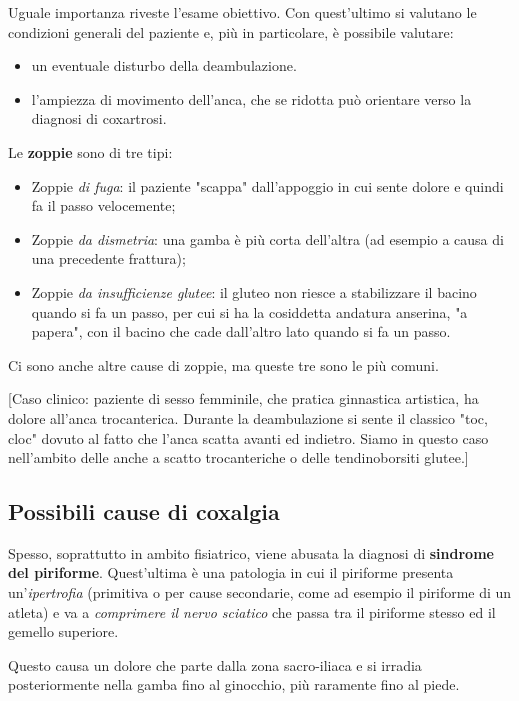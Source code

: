 Uguale importanza riveste l'esame obiettivo. Con quest'ultimo si valutano le condizioni generali del paziente e, più in particolare, è possibile valutare:

\begin{itemize}
\item
  un eventuale disturbo della deambulazione.
\item
  l'ampiezza di movimento dell'anca, che se ridotta può orientare verso la diagnosi di coxartrosi.
\end{itemize}

Le \textbf{zoppie} sono di tre tipi:

\begin{itemize}
\item
  Zoppie \emph{di fuga}: il paziente "scappa" dall'appoggio in cui sente dolore e quindi fa il passo velocemente;
\item
  Zoppie \emph{da dismetria}: una gamba è più corta dell'altra (ad esempio a causa di una precedente frattura);
\item
  Zoppie \emph{da insufficienze glutee}: il gluteo non riesce a stabilizzare il bacino quando si fa un passo, per cui si ha la cosiddetta andatura anserina, "a papera", con il bacino che cade dall'altro lato quando si fa un passo.
\end{itemize}

Ci sono anche altre cause di zoppie, ma queste tre sono le più comuni.

{[}Caso clinico: paziente di sesso femminile, che pratica ginnastica artistica, ha dolore all'anca trocanterica. Durante la deambulazione si sente il classico "toc, cloc" dovuto al fatto che l'anca scatta avanti ed indietro. Siamo in questo caso nell'ambito delle anche a scatto trocanteriche o delle tendinoborsiti glutee.{]}

\subsection{Possibili cause di coxalgia}

Spesso, soprattutto in ambito fisiatrico, viene abusata la diagnosi di \textbf{sindrome del piriforme}. Quest'ultima è una patologia in cui il piriforme presenta un'\emph{ipertrofia} (primitiva o per cause secondarie, come ad esempio il piriforme di un atleta) e va a
\emph{comprimere il nervo sciatico} che passa tra il piriforme stesso ed il gemello superiore.

Questo causa un dolore che parte dalla zona sacro-iliaca e si irradia posteriormente nella gamba fino al ginocchio, più raramente fino al piede.

